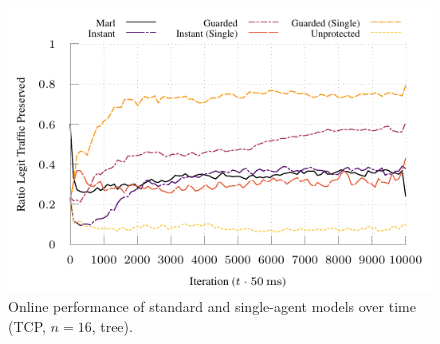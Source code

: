 \documentclass[10pt, times, conference, letterpaper]{IEEEtran}
\begin{document}
\begin{figure}
	\centering
	\includegraphics[width=0.75\linewidth]{../plots/infocom-tcp-16-single}
	\vspace{-1em}
	\caption{
		Online performance of standard and single-agent models over time (TCP, $n=16$, tree).
		\label{fig:tcp-tree-16}
	}
\vspace{-1em}
\end{figure}

%	

%	

%	
\end{document}
